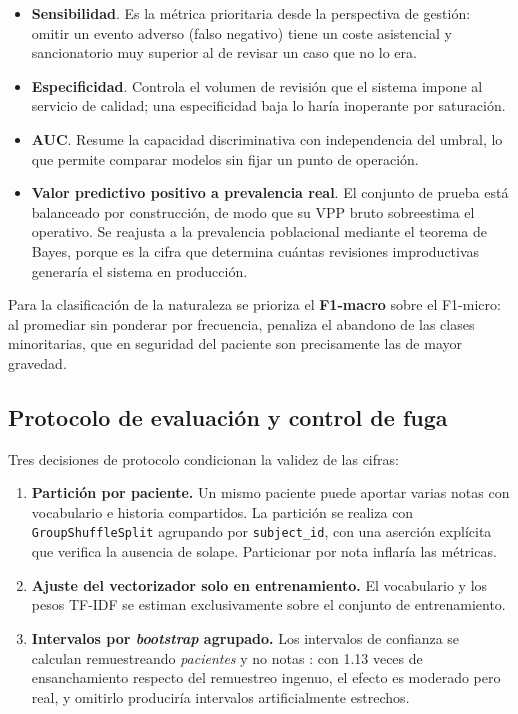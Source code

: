 \documentclass[conference]{IEEEtran}
\begin{document}
\begin{itemize}
\item \textbf{Sensibilidad}. Es la métrica prioritaria desde la perspectiva de
gestión: omitir un evento adverso (falso negativo) tiene un coste asistencial y
sancionatorio muy superior al de revisar un caso que no lo era.
\item \textbf{Especificidad}. Controla el volumen de revisión que el sistema
impone al servicio de calidad; una especificidad baja lo haría inoperante por
saturación.
\item \textbf{AUC}. Resume la capacidad discriminativa con independencia del
umbral, lo que permite comparar modelos sin fijar un punto de operación.
\item \textbf{Valor predictivo positivo a prevalencia real}. El conjunto de
prueba está balanceado por construcción, de modo que su VPP bruto sobreestima
el operativo. Se reajusta a la prevalencia poblacional mediante el teorema de
Bayes, porque es la cifra que determina cuántas revisiones improductivas
generaría el sistema en producción.
\end{itemize}

Para la clasificación de la naturaleza se prioriza el \textbf{F1-macro} sobre
el F1-micro: al promediar sin ponderar por frecuencia, penaliza el abandono de
las clases minoritarias, que en seguridad del paciente son precisamente las de
mayor gravedad.

\subsection{Protocolo de evaluación y control de fuga}
Tres decisiones de protocolo condicionan la validez de las cifras:

\begin{enumerate}
\item \textbf{Partición por paciente.} Un mismo paciente puede aportar varias
notas con vocabulario e historia compartidos. La partición se realiza con
\texttt{GroupShuffleSplit} agrupando por \texttt{subject\_id}, con una
aserción explícita que verifica la ausencia de solape. Particionar por nota
inflaría las métricas.
\item \textbf{Ajuste del vectorizador solo en entrenamiento.} El vocabulario y
los pesos TF-IDF se estiman exclusivamente sobre el conjunto de entrenamiento.
\item \textbf{Intervalos por \emph{bootstrap} agrupado.} Los intervalos de
confianza se calculan remuestreando \emph{pacientes} y no notas
\cite{efron}: con 1.13 veces de
ensanchamiento respecto del remuestreo ingenuo, el efecto es moderado pero
real, y omitirlo produciría intervalos artificialmente estrechos.
\end{enumerate}
\end{document}
